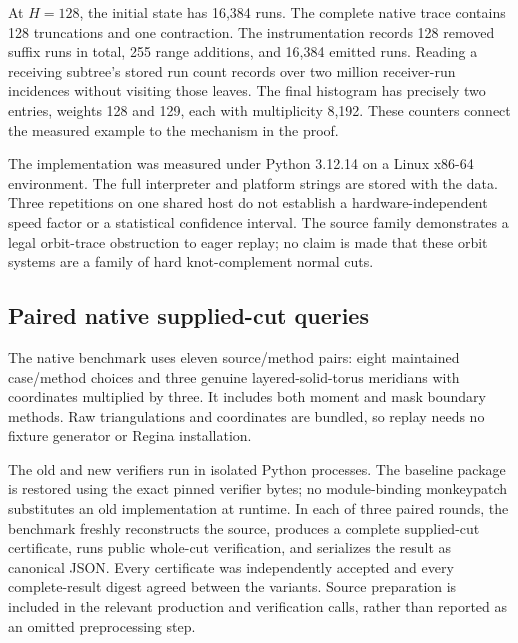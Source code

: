 At \(H=128\), the initial state has 16,384 runs. The complete native trace
contains 128 truncations and one contraction. The instrumentation records
128 removed suffix runs in total, 255 range additions, and 16,384 emitted
runs. Reading a receiving subtree's stored run count records over two
million receiver-run incidences without visiting those leaves. The final
histogram has precisely two entries, weights 128 and 129, each with
multiplicity 8,192. These counters connect the measured example to the
mechanism in the proof.

The implementation was measured under Python 3.12.14 on a Linux x86-64
environment. The full interpreter and platform strings are stored with
the data. Three repetitions on one shared host do not establish a
hardware-independent speed factor or a statistical confidence interval.
The source family demonstrates a legal orbit-trace obstruction to eager
replay; no claim is made that these orbit systems are a family of hard
knot-complement normal cuts.

\subsection{Paired native supplied-cut queries}

The native benchmark uses eleven source/method pairs: eight maintained
case/method choices and three genuine layered-solid-torus meridians with
coordinates multiplied by three. It includes both moment and mask boundary
methods. Raw triangulations and coordinates are bundled, so replay needs
no fixture generator or Regina installation.

The old and new verifiers run in isolated Python processes. The baseline
package is restored using the exact pinned verifier bytes; no module-binding
monkeypatch substitutes an old implementation at runtime. In each of three
paired rounds, the benchmark freshly reconstructs the source, produces a
complete supplied-cut certificate, runs public whole-cut verification, and
serializes the result as canonical JSON. Every certificate was independently
accepted and every complete-result digest agreed between the variants.
Source preparation is included in the relevant production and verification
calls, rather than reported as an omitted preprocessing step.

\begin{table}[htbp]
\centering\footnotesize
\setlength{\tabcolsep}{4pt}

\caption{All native paired results. Replay times are seconds; ratios
are baseline/new medians. The query ratio includes production, whole-cut
verification, and serialization. The layered rows use moments and scale
three. The final row is a ratio of sums of case medians.}
\label{tab:native-timing}
\end{table}

